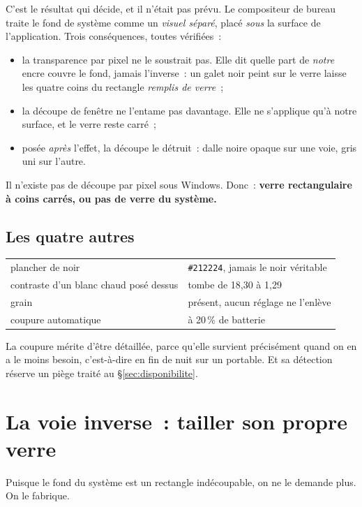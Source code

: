 \documentclass[11pt,a4paper]{article}
\newcommand{\uni}[1]{\texttt{#1}}
\newcommand{\np}[1]{#1}
\begin{document}
C'est le résultat qui décide, et il n'était pas prévu. Le compositeur de
bureau traite le fond de système comme un \emph{visuel séparé}, placé
\emph{sous} la surface de l'application. Trois conséquences, toutes vérifiées~:

\begin{itemize}
\item la transparence par pixel ne le soustrait pas. Elle dit quelle part de
\emph{notre} encre couvre le fond, jamais l'inverse~: un galet noir peint sur
le verre laisse les quatre coins du rectangle \emph{remplis de verre}~;
\item la découpe de fenêtre ne l'entame pas davantage. Elle ne s'applique qu'à
notre surface, et le verre reste carré~;
\item posée \emph{après} l'effet, la découpe le détruit~: dalle noire opaque
sur une voie, gris uni sur l'autre.
\end{itemize}

Il n'existe pas de découpe par pixel sous Windows. Donc~: \textbf{verre
rectangulaire à coins carrés, ou pas de verre du système.}

\subsection{Les quatre autres}

\begin{center}
\begin{tabular}{ll}
\toprule
plancher de noir & \uni{\#212224}, jamais le noir véritable \\
contraste d'un blanc chaud posé dessus & tombe de \np{18,30} à \np{1,29} \\
grain & présent, aucun réglage ne l'enlève \\
coupure automatique & à 20\,\% de batterie \\
\bottomrule
\end{tabular}
\end{center}

La coupure mérite d'être détaillée, parce qu'elle survient précisément quand
on en a le moins besoin, c'est-à-dire en fin de nuit sur un portable. Et sa
détection réserve un piège traité au §\ref{sec:disponibilite}.

\section{La voie inverse~: tailler son propre verre}

Puisque le fond du système est un rectangle indécoupable, on ne le demande
plus. On le fabrique.
\end{document}
